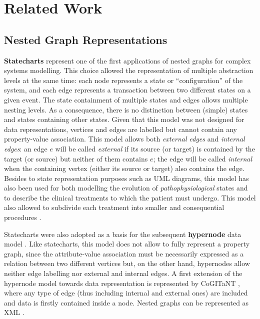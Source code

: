 \section{Related Work}

\subsection{Nested Graph Representations}
\textbf{Statecharts} \cite{statecharts} represent one of the first applications of nested graphs for complex systems modelling. This choice allowed the representation of multiple abstraction levels at the same time: each node represents a  state or ``configuration'' of the system, and each edge represents a transaction between two different states on a given event. The state containment of multiple states and edges allows multiple nesting levels.  As a consequence,  there is no distinction between (simple) states and states containing other states. Given that this model was not designed for data representations, vertices and edges are labelled but cannot contain any property-value association. 
This model allows both \textit{external edges} and \textit{internal edges}: an edge  $e$ will be called \textit{external} if its source (or target) is contained by the target (or source) but neither of them contains $e$; the edge will be called \textit{internal} when the containing vertex (either its source or target) also contains the edge. Besides to state representation purposes such as UML diagrams, this model has also been  used for both modelling the evolution of \textit{pathophysiological} states and to describe the clinical treatments to which the patient must undergo. This model also allowed to subdivide each treatment  into smaller and consequential procedures \cite{NestedGlaucoma}.

Statecharts were also adopted as a basis for the subsequent \textbf{hypernode} data model \cite{Poulovassilis1994}. Like statecharts, this model does not allow to fully represent a property graph, since the attribute-value association must be necessarily expressed as a relation between two different vertices but, on the other hand, hypernodes allow neither edge labelling nor external and internal edges. A first extension of the hypernode model towards data representation is represented by CoGITaNT \cite{GenestS98}, where any type of edge (thus including internal and external ones) are included and data is firstly contained inside a node. Nested graphs can be represented as XML \cite{graphml,GXL}.

